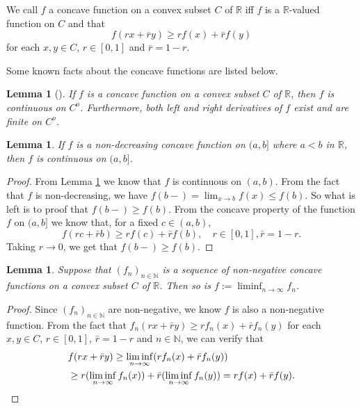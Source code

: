 \documentclass[12pt,a4paper]{amsart}
\numberwithin{equation}{section}
\theoremstyle{plain}
\newtheorem{lem}[thm]{Lemma}
\theoremstyle{definition}
\begin{document}
We call $f$ a concave function on a convex subset $C$ of $\mathbb R$ iff $f$ is a $\mathbb R$-valued function on $C$ and that
\[
  f(rx+\bar r y) \geq r f(x) + \bar r f(y)
\]
for each $x,y \in C$, $r \in [0,1]$ and $\bar r = 1 - r$. 

Some known facts about the concave functions are listed below.

\begin{lem}[{\cite[Corollary 6.3.3.]{Dudley2002Real}}]
  \label{lem:ACC}
	If $f$ is a concave function on a convex subset $C$ of $\mathbb R$, then $f$ is continuous on $C^o$.
 Furthermore, both left and right derivatives of $f$ exist and are finite on $C^o$.
\end{lem}

\begin{lem}
  \label{lem:ACR}
	If $f$ is a non-decreasing concave function on $(a,b]$ where $a<b$ in $\mathbb R$, then $f$ is continuous on $(a,b]$.
\end{lem}

\begin{proof}
From Lemma \ref{lem:ACC} we know that $f$ is continuous on $(a,b)$.
From the fact that $f$ is non-decreasing, we have $f(b-) = \lim_{x \to b} f(x) \leq f(b)$. 
So what is left is to proof that $f(b-) \geq f(b)$.
From the concave property of the function $f$ on $(a,b]$ we know that, for a fixed $c \in (a,b)$,
\[
f(rc + \bar r b) 
\geq r f(c) + \bar r f(b),
\quad r\in [0,1], \bar r = 1 - r.
\]
Taking $r\to 0$, we get that $f(b-)\geq f(b)$.
\end{proof}

\begin{lem}
	\label{lem:ACL}
  Suppose that $(f_n)_{n \in \mathbb N}$ is a sequence of non-negative concave functions on a convex subset $C$ of $\mathbb R$.
  Then so is $f:= \liminf_{n\to \infty} f_n$.
\end{lem}

\begin{proof}
  Since $(f_n)_{n \in \mathbb N}$ are non-negative, we know $f$ is also a non-negative function.
  From the fact that
\(
  f_n(rx+\bar r y) \geq r f_n(x) + \bar r f_n(y)
\)
for each $x,y\in C$, $r\in [0,1]$, $\bar r = 1 - r$ and $n \in \mathbb N$, we can verify that
\begin{align}
	& f(rx+ \bar r y) 
   \geq \liminf_{n\to \infty} (r f_n(x) + \bar r f_n(y))
   \\ & \geq r (\liminf_{n\to \infty} f_n(x)) + \bar r (\liminf_{n\to \infty} f_n(y)) 
    = rf(x) + \bar r f(y).
        \qedhere
\end{align}
\end{proof}
\end{document}
